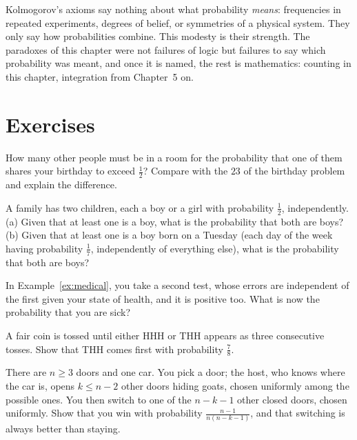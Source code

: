 \begin{beauty}
Kolmogorov's axioms say nothing about what probability \emph{means}: frequencies in repeated experiments,
degrees of belief, or symmetries of a physical system. They only say how probabilities combine. This modesty is
their strength. The paradoxes of this chapter were not failures of logic but failures to say which probability
was meant, and once it is named, the rest is mathematics: counting in this chapter, integration from Chapter~5 on.
\end{beauty}

\section{Exercises}

\begin{exercise}[$\star$]\label{ex:mybirthday}
How many other people must be in a room for the probability that one of them shares your birthday to exceed
$\frac12$? Compare with the $23$ of the birthday problem and explain the difference.
\end{exercise}

\begin{exercise}[$\star$]\label{ex:twochildren}
A family has two children, each a boy or a girl with probability $\frac12$, independently. (a) Given that at
least one is a boy, what is the probability that both are boys? (b) Given that at least one is a boy born on a
Tuesday (each day of the week having probability $\frac17$, independently of everything else), what is the
probability that both are boys?
\end{exercise}

\begin{exercise}[$\star$]\label{ex:twotests}
In Example~\ref{ex:medical}, you take a second test, whose errors are independent of the first given your state
of health, and it is positive too. What is now the probability that you are sick?
\end{exercise}

\begin{exercise}[$\star$]\label{ex:penney}
A fair coin is tossed until either HHH or THH appears as three consecutive tosses. Show that THH comes first with
probability $\frac78$.
\end{exercise}

\begin{exercise}[$\star\star$]\label{ex:montyn}
There are $n\ge3$ doors and one car. You pick a door; the host, who knows where the car is, opens $k\le n-2$ other
doors hiding goats, chosen uniformly among the possible ones. You then switch to one of the $n-k-1$ other closed
doors, chosen uniformly. Show that you win with probability $\frac{n-1}{n(n-k-1)}$, and that switching is always
better than staying.
\end{exercise}

